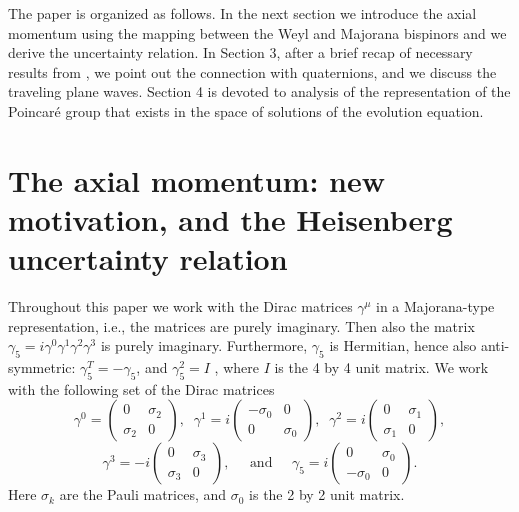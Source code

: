 \documentclass[12pt]{article}
\begin{document}
The paper is organized as follows. In the next section  we  introduce the axial momentum  using the mapping between the Weyl and Majorana bispinors and we derive the uncertainty relation.   In Section 3, after a brief  recap of necessary results from  \cite{10},  we point out the connection with quaternions, and we discuss the traveling plane waves. Section 4 is devoted to analysis of  the representation of the Poincar\'e group  that exists in the space of solutions of the evolution equation. 







 

\section{The axial momentum:  new motivation, and  the Heisenberg uncertainty relation}
Throughout this paper we work with the Dirac matrices $\gamma^{\mu}$ in a  Majorana-type representation, i.e., the matrices are purely imaginary. Then also the matrix $\gamma_5 = i \gamma^0 \gamma^1 \gamma^2 \gamma^3$ is purely imaginary. Furthermore,  $\gamma_5$ is Hermitian,  hence also anti-symmetric:   $\gamma_5^T = - \gamma_5$, and  $\gamma_5^2 = I$ , where $I$ is the 4 by 4 unit matrix.  We work with the following set of the Dirac matrices
\[ \gamma^0 = \left(  \begin{array}{cc} 0 & \sigma_2 \\ \sigma_2 & 0 \end{array}  \right), \;\;    \gamma^1 = i \left(  \begin{array}{cc} - \sigma_0 & 0 \\ 0 & \sigma_0 \end{array}  \right), \;\;   \gamma^2 = i \left(  \begin{array}{cc} 0 & \sigma_1 \\ \sigma_1 & 0 \end{array}  \right),\]  \[  \gamma^3 = -i \left(  \begin{array}{cc} 0 & \sigma_3 \\ \sigma_3 & 0 \end{array}  \right),  \;\;\;\;\; \mbox{and} \;\;\;\;\;  \gamma_5 = i \left(  \begin{array}{cc} 0 & \sigma_0 \\ - \sigma_0 & 0 \end{array}  \right).  \]
Here $\sigma_k$ are the Pauli matrices, and $\sigma_0$ is the 2 by 2 unit matrix.
\end{document}
